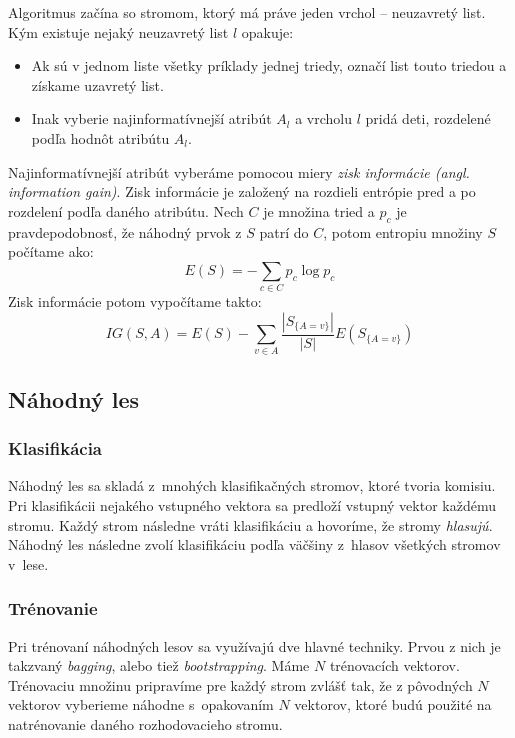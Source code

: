 Algoritmus začína so stromom, ktorý má práve jeden vrchol -- neuzavretý list. Kým existuje nejaký neuzavretý list $l$ opakuje:
\begin{itemize}
    \item Ak sú v jednom liste všetky príklady jednej triedy, označí list touto triedou a získame uzavretý list.
    \item Inak vyberie najinformatívnejší atribút $A_l$ a vrcholu $l$ pridá deti, rozdelené podľa hodnôt atribútu $A_l$.
\end{itemize}

Najinformatívnejší atribút vyberáme pomocou miery \textit{zisk informácie (angl. information gain)}. Zisk informácie je založený na rozdieli entrópie pred a po rozdelení podľa daného atribútu. Nech $C$ je množina tried a $p_c$ je pravdepodobnosť, že náhodný prvok z $S$ patrí do $C$, potom entropiu množiny $S$ počítame ako:
$$E(S) = -\sum_{c \in C} p_c\log{p_c}$$
Zisk informácie potom vypočítame takto:
$$IG(S,A) = E(S) - \sum_{v \in A} \frac{\left| S_{\{A=v\}} \right|}{\left| S \right|} E\left(S_{\{A=v\}}\right)$$

\subsection{Náhodný les}

\subsubsection{Klasifikácia}
Náhodný les sa skladá z~mnohých klasifikačných stromov, ktoré tvoria komisiu. Pri klasifikácii nejakého vstupného vektora sa predloží vstupný vektor každému stromu. Každý strom následne vráti klasifikáciu a hovoríme, že stromy \textit{hlasujú}. Náhodný les následne zvolí klasifikáciu podľa väčšiny z~hlasov všetkých stromov v~lese.


\subsubsection{Trénovanie}

Pri trénovaní náhodných lesov sa využívajú dve hlavné techniky. Prvou z nich je takzvaný \textit{bagging}, alebo tiež \textit{bootstrapping}. Máme $N$ trénovacích vektorov. Trénovaciu množinu pripravíme pre každý strom zvlášť tak, že z pôvodných $N$ vektorov vyberieme náhodne s~opakovaním $N$ vektorov, ktoré budú použité na natrénovanie daného rozhodovacieho stromu.

